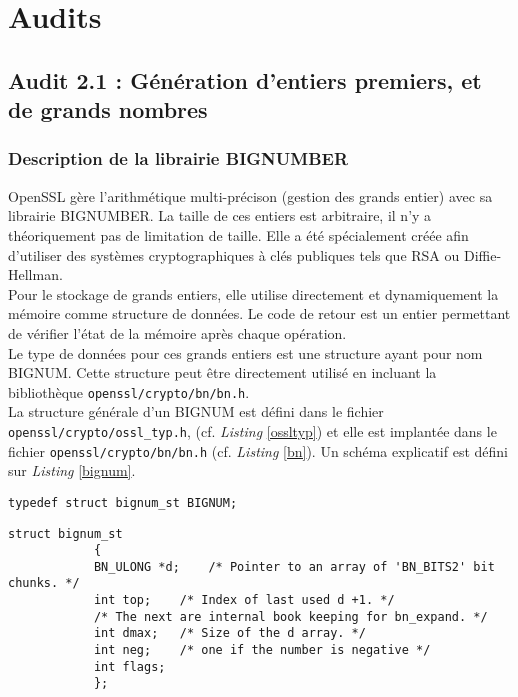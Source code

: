 \section{Audits}

	\subsection{Audit 2.1 : Génération d'entiers premiers, et de grands nombres}

		\subsubsection{Description de la librairie BIGNUMBER}

			OpenSSL gère l'arithmétique multi-précison (gestion des grands entier) avec sa librairie BIGNUMBER. La taille de ces entiers est arbitraire, il n'y a théoriquement pas de limitation de taille. Elle a été spécialement créée afin d'utiliser des systèmes cryptographiques à clés publiques tels que RSA ou Diffie-Hellman.\\

			Pour le stockage de grands entiers, elle utilise directement et dynamiquement la mémoire comme structure de données. Le code de retour est un entier permettant de vérifier l'état de la mémoire après chaque opération.\\

			Le type de données pour ces grands entiers est une structure ayant pour nom BIGNUM. Cette structure peut être directement utilisé en incluant la bibliothèque \texttt{openssl/crypto/bn/bn.h}.\\

			La structure générale d'un BIGNUM est défini dans le fichier \texttt{openssl/crypto/ossl\_typ.h}, (cf. \textit{Listing} \ref{ossltyp}) et elle est implantée dans le fichier \texttt{openssl/crypto/bn/bn.h} (cf. \textit{Listing} \ref{bn}). Un schéma explicatif est défini sur \textit{Listing} \ref{bignum}.

			\begin{lstlisting}[style=customc,caption=ossl\_typ.h, label=ossltyp]
			typedef struct bignum_st BIGNUM;
			\end{lstlisting}

			\begin{lstlisting}[style=customc,caption=bn.h, label=bn]
			struct bignum_st
			{
			BN_ULONG *d;	/* Pointer to an array of 'BN_BITS2' bit chunks. */
			int top;	/* Index of last used d +1. */
			/* The next are internal book keeping for bn_expand. */
			int dmax;	/* Size of the d array. */
			int neg;	/* one if the number is negative */
			int flags;
			};
			\end{lstlisting}

